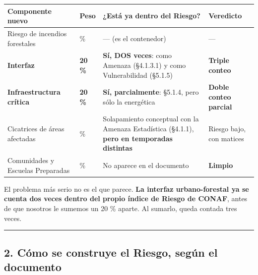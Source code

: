 \documentclass[
  spanish,
  10pt,
]{article}
\begin{document}
\begin{longtable}[]{@{}
  >{\raggedright\arraybackslash}p{}
  >{\raggedleft\arraybackslash}p{}
  >{\raggedright\arraybackslash}p{}
  >{\raggedright\arraybackslash}p{}@{}}
\toprule\noalign{}
\begin{minipage}[b]{\linewidth}\raggedright
Componente nuevo
\end{minipage} & \begin{minipage}[b]{\linewidth}\raggedleft
Peso
\end{minipage} & \begin{minipage}[b]{\linewidth}\raggedright
¿Está ya dentro del Riesgo?
\end{minipage} & \begin{minipage}[b]{\linewidth}\raggedright
Veredicto
\end{minipage} \\
\midrule\noalign{}
\endhead
\bottomrule\noalign{}
\endlastfoot
Riesgo de incendios forestales & 30 \% & --- (es el contenedor) & --- \\
\textbf{Interfaz} & \textbf{20 \%} & \textbf{Sí, DOS veces}: como
Amenaza (§4.1.3.1) y como Vulnerabilidad (§5.1.5) & \textbf{Triple
conteo} \\
\textbf{Infraestructura crítica} & \textbf{20 \%} & \textbf{Sí,
parcialmente}: §5.1.4, pero sólo la energética & \textbf{Doble conteo
parcial} \\
Cicatrices de áreas afectadas & 15 \% & Solapamiento conceptual con la
Amenaza Estadística (§4.1.1), \textbf{pero en temporadas distintas} &
Riesgo bajo, con matices \\
Comunidades y Escuelas Preparadas & 15 \% & No aparece en el documento &
\textbf{Limpio} \\
\end{longtable}

El problema más serio no es el que parece. \textbf{La interfaz
urbano-forestal ya se cuenta dos veces dentro del propio índice de
Riesgo de CONAF}, antes de que nosotros le sumemos un 20 \% aparte. Al
sumarlo, queda contada tres veces.

\begin{center}\rule{0.5\linewidth}{0.5pt}\end{center}

\subsection{2. Cómo se construye el Riesgo, según el
documento}\label{cuxf3mo-se-construye-el-riesgo-seguxfan-el-documento}
\end{document}

